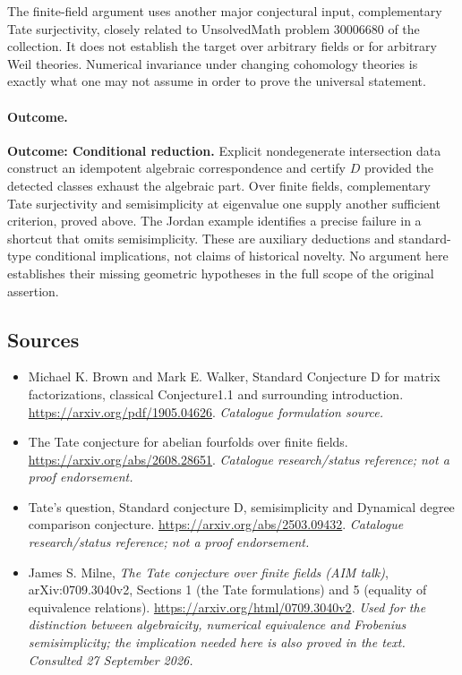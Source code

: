\documentclass[11pt,a4paper]{article}
\numberwithin{equation}{section}
\begin{document}
The finite-field argument uses another major conjectural input,
complementary Tate surjectivity, closely related to UnsolvedMath problem 30006680 of the
collection. It does not establish the target over arbitrary fields or
for arbitrary Weil theories. Numerical invariance under changing
cohomology theories is exactly what one may not assume in order to
prove the universal statement.

\paragraph{Outcome.}
\textbf{Outcome: Conditional reduction.}
Explicit nondegenerate intersection data construct an idempotent algebraic
correspondence and certify $D$ provided the detected classes exhaust the
algebraic part. Over finite fields, complementary Tate surjectivity and
semisimplicity at eigenvalue one supply another sufficient criterion,
proved above. The Jordan example identifies a precise failure in a
shortcut that omits semisimplicity. These are auxiliary deductions and
standard-type conditional implications, not claims of historical novelty.
No argument here establishes their missing geometric hypotheses in the
full scope of the original assertion.
\subsection{Sources}
\begin{itemize}\raggedright
\item[\textnormal{[S1]}]\hypertarget{source:30006693:1}{} Michael K. Brown and Mark E. Walker, Standard Conjecture D for matrix factorizations, classical Conjecture1.1 and surrounding introduction.
\url{https://arxiv.org/pdf/1905.04626}.
{\small\textit{Catalogue formulation source.}}
\item[\textnormal{[S2]}]\hypertarget{source:30006693:2}{} The Tate conjecture for abelian fourfolds over finite fields.
\url{https://arxiv.org/abs/2608.28651}.
{\small\textit{Catalogue research/status reference; not a proof endorsement.}}
\item[\textnormal{[S3]}]\hypertarget{source:30006693:3}{} Tate's question, Standard conjecture D, semisimplicity and Dynamical degree comparison conjecture.
\url{https://arxiv.org/abs/2503.09432}.
{\small\textit{Catalogue research/status reference; not a proof endorsement.}}
\item[\textnormal{[E1]}]\hypertarget{extra:30006693:1}{} James S. Milne,
\emph{The Tate conjecture over finite fields (AIM talk)}, arXiv:0709.3040v2,
Sections 1 (the Tate formulations) and 5 (equality of equivalence relations).
\url{https://arxiv.org/html/0709.3040v2}.
{\small\textit{Used for the distinction between algebraicity, numerical equivalence and Frobenius semisimplicity; the implication needed here is also proved in the text. Consulted 27 September 2026.}}
\end{itemize}
\end{document}
